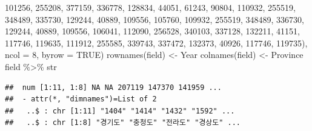 \documentclass[
]{article}
\newenvironment{Shaded}{\begin{snugshade}}{\end{snugshade}}
\newcommand{\AttributeTok}[1]{\textcolor[rgb]{0.77,0.63,0.00}{#1}}
\newcommand{\ConstantTok}[1]{\textcolor[rgb]{0.00,0.00,0.00}{#1}}
\newcommand{\DecValTok}[1]{\textcolor[rgb]{0.00,0.00,0.81}{#1}}
\newcommand{\FunctionTok}[1]{\textcolor[rgb]{0.00,0.00,0.00}{#1}}
\newcommand{\NormalTok}[1]{#1}
\newcommand{\OtherTok}[1]{\textcolor[rgb]{0.56,0.35,0.01}{#1}}
\newcommand{\SpecialCharTok}[1]{\textcolor[rgb]{0.00,0.00,0.00}{#1}}
\begin{document}
\begin{Shaded}
\begin{Highlighting}[]
                  \DecValTok{101256}\NormalTok{, }\DecValTok{255208}\NormalTok{, }\DecValTok{377159}\NormalTok{, }\DecValTok{336778}\NormalTok{, }\DecValTok{128834}\NormalTok{, }\DecValTok{44051}\NormalTok{, }\DecValTok{61243}\NormalTok{, }\DecValTok{90804}\NormalTok{,}
                  \DecValTok{110932}\NormalTok{, }\DecValTok{255519}\NormalTok{, }\DecValTok{348489}\NormalTok{, }\DecValTok{335730}\NormalTok{, }\DecValTok{129244}\NormalTok{, }\DecValTok{40889}\NormalTok{, }\DecValTok{109556}\NormalTok{, }\DecValTok{105760}\NormalTok{,}
                  \DecValTok{109932}\NormalTok{, }\DecValTok{255519}\NormalTok{, }\DecValTok{348489}\NormalTok{, }\DecValTok{336730}\NormalTok{, }\DecValTok{129244}\NormalTok{, }\DecValTok{40889}\NormalTok{, }\DecValTok{109556}\NormalTok{, }\DecValTok{106041}\NormalTok{,}
                  \DecValTok{112090}\NormalTok{, }\DecValTok{256528}\NormalTok{, }\DecValTok{340103}\NormalTok{, }\DecValTok{337128}\NormalTok{, }\DecValTok{132211}\NormalTok{, }\DecValTok{41151}\NormalTok{, }\DecValTok{117746}\NormalTok{, }\DecValTok{119635}\NormalTok{, }
                  \DecValTok{111912}\NormalTok{, }\DecValTok{255585}\NormalTok{, }\DecValTok{339743}\NormalTok{, }\DecValTok{337472}\NormalTok{, }\DecValTok{132373}\NormalTok{, }\DecValTok{40926}\NormalTok{, }\DecValTok{117746}\NormalTok{, }\DecValTok{119735}\NormalTok{), }
                \AttributeTok{ncol =} \DecValTok{8}\NormalTok{, }
                \AttributeTok{byrow =} \ConstantTok{TRUE}\NormalTok{)}
\FunctionTok{rownames}\NormalTok{(field) }\OtherTok{\textless{}{-}}\NormalTok{ Year}
\FunctionTok{colnames}\NormalTok{(field) }\OtherTok{\textless{}{-}}\NormalTok{ Province}
\NormalTok{field }\SpecialCharTok{\%\textgreater{}\%}\NormalTok{ str}
\end{Highlighting}
\end{Shaded}

\begin{verbatim}
##  num [1:11, 1:8] NA NA 207119 147370 141959 ...
##  - attr(*, "dimnames")=List of 2
##   ..$ : chr [1:11] "1404" "1414" "1432" "1592" ...
##   ..$ : chr [1:8] "경기도" "충청도" "전라도" "경상도" ...
\end{verbatim}
\end{document}
